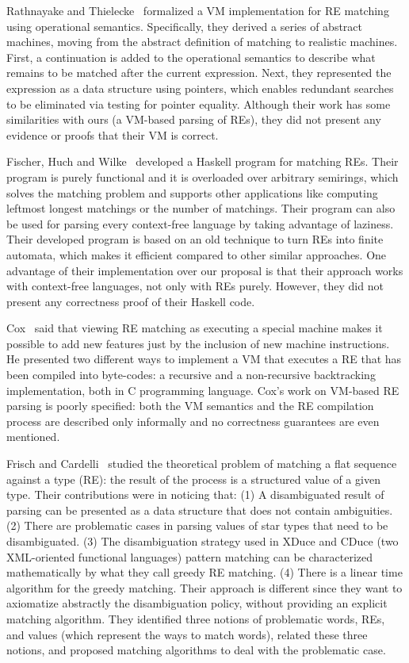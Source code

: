 \documentclass[review]{elsarticle}
\theoremstyle{definition}
\begin{document}
Rathnayake and Thielecke~\cite{Rathnayake2011} formalized a VM implementation for RE matching using
operational semantics. Specifically, they derived a series of abstract machines, moving from the abstract
definition of matching to realistic machines. First, a continuation is added to the operational semantics
to describe what remains to be matched after the current expression. Next, they represented the expression
as a data structure using pointers, which enables redundant searches to be eliminated via testing for pointer
equality. Although their work has some similarities with ours (a VM-based parsing of REs), they did not present
any evidence or proofs that their VM is correct.

Fischer, Huch and Wilke~\cite{Fischer2010} developed a Haskell program for matching REs. Their program is purely
functional and it is overloaded over arbitrary semirings, which solves the matching problem and supports other
applications like computing leftmost longest matchings or the number of matchings. Their program can also be used
for parsing every context-free language by taking advantage of laziness. Their developed program is based on an
old technique to turn REs into finite automata, which makes it efficient compared to other similar approaches.
One advantage of their implementation over our proposal is that their approach works with context-free languages,
not only with REs purely. However, they did not present any correctness proof of their Haskell code.

Cox~\cite{Cox2009} said that viewing RE matching as executing a special machine makes it possible to add new
features just by the inclusion of new machine instructions. He presented two different ways to implement
a VM that executes a RE that has been compiled into  byte-codes: a recursive and a non-recursive
backtracking implementation, both in C programming language. Cox's work on VM-based RE parsing is poorly specified:
both the VM semantics and the RE compilation process are described only informally
and no correctness guarantees are even mentioned.

Frisch and Cardelli~\cite{Frisch2004} studied the theoretical problem of matching a flat sequence against a type (RE): the
result of the process is a structured value of a given type. Their contributions were in noticing that: (1) A disambiguated
result of parsing can be presented as a data structure that does not contain ambiguities. (2) There are problematic cases in
parsing values of star types that need to be disambiguated. (3) The disambiguation strategy used in XDuce and CDuce (two
XML-oriented functional languages) pattern matching can be characterized mathematically by what they call greedy RE matching.
(4) There is a linear time algorithm for the greedy matching. Their approach is different since they want to axiomatize abstractly
the disambiguation policy, without providing an explicit matching algorithm. They identified three notions of problematic words, REs,
and values (which represent the ways to match words), related these three notions, and proposed matching algorithms to deal with the
problematic case.
\end{document}

